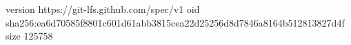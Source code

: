 version https://git-lfs.github.com/spec/v1
oid sha256:ea6d70585f8801c601d61abb3815cea22d25256d8d7846a8164b512813827d4f
size 125758
